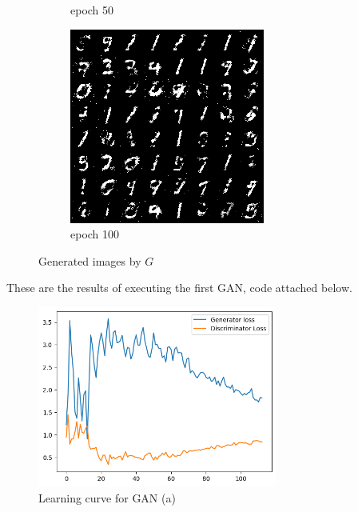 \documentclass[a4paper]{article}
\theoremstyle{definition}
\newenvironment{soln}{
	\leavevmode\color{blue}\ignorespaces
}{}
\begin{document}
\begin{enumerate} [label=(\alph*)]
\begin{figure}[H]
\begin{subfigure}[b]{0.3\textwidth}
				\caption{epoch 50}
			\end{subfigure}
			\hfill
			\begin{subfigure}[b]{0.3\textwidth}
				\centering
				\includegraphics[width=\textwidth]{gan_q1_epoch100.png}
				\caption{epoch 100}
			\end{subfigure}
			\caption{Generated images by $G$}
			\label{fig:three graphs}
		\end{figure}
		
		
		\begin{soln}
		These are the results of executing the first GAN, code attached below.
		\begin{figure}[H]
			\centering
			\includegraphics[width=0.7\textwidth]{1-LearningCurve.png}
			\caption{Learning curve for GAN (a)}
			\label{fig:loss_1}
		\end{figure}
		

\end{soln}
\end{enumerate}
\end{document}
